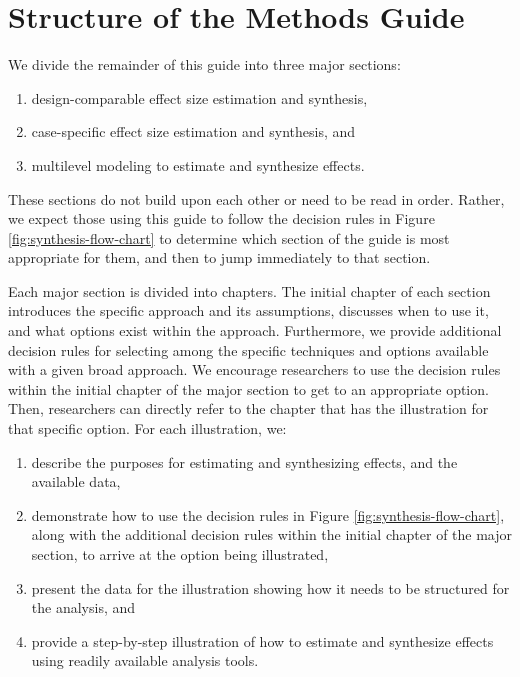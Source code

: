\documentclass[
]{book}
\providecommand{\tightlist}{%
  \setlength{\itemsep}{0pt}\setlength{\parskip}{0pt}}
\begin{document}
\hypertarget{structure-of-the-methods-guide}{%
\section{Structure of the Methods Guide}\label{structure-of-the-methods-guide}}

We divide the remainder of this guide into three major sections:

\begin{enumerate}
\def\labelenumi{\alph{enumi})}
\tightlist
\item
  design-comparable effect size estimation and synthesis,
\item
  case-specific effect size estimation and synthesis, and
\item
  multilevel modeling to estimate and synthesize effects.
\end{enumerate}

These sections do not build upon each other or need to be read in order. Rather, we expect those using this guide to follow the decision rules in Figure \ref{fig:synthesis-flow-chart} to determine which section of the guide is most appropriate for them, and then to jump immediately to that section.

Each major section is divided into chapters.
The initial chapter of each section introduces the specific approach and its assumptions, discusses when to use it, and what options exist within the approach.
Furthermore, we provide additional decision rules for selecting among the specific techniques and options available with a given broad approach.
We encourage researchers to use the decision rules within the initial chapter of the major section to get to an appropriate option.
Then, researchers can directly refer to the chapter that has the illustration for that specific option.
For each illustration, we:

\begin{enumerate}
\def\labelenumi{\arabic{enumi})}
\tightlist
\item
  describe the purposes for estimating and synthesizing effects, and the available data,
\item
  demonstrate how to use the decision rules in Figure \ref{fig:synthesis-flow-chart}, along with the additional decision rules within the initial chapter of the major section, to arrive at the option being illustrated,
\item
  present the data for the illustration showing how it needs to be structured for the analysis, and
\item
  provide a step-by-step illustration of how to estimate and synthesize effects using readily available analysis tools.
\end{enumerate}
\end{document}
